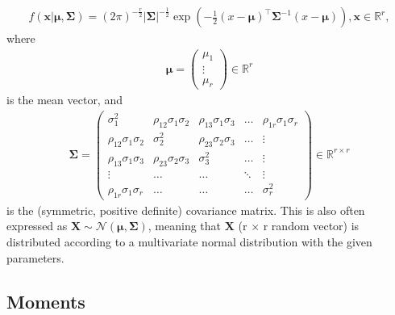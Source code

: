 \begin{definition}
    \begin{align}
        f(\bm{x}| \bm{\mu}, \bm{\Sigma})
        = (2\pi)^{-\frac{r}{2}}
        \left|\bm{\Sigma}\right|^{-\frac{1}{2}}
        \exp\left(-\frac{1}{2}(x-\bm{\mu})^\top \bm{\Sigma}^{-1} (x-\bm{\mu})\right),
        \bm{x} \in \mathbb{R}^r,
    \end{align}
    where
    \begin{align}
        \bm{\mu} =
        \begin{pmatrix}
            \mu_1  \\
            \vdots \\
            \mu_r
        \end{pmatrix}
        \in \mathbb{R}^r
    \end{align}
    is the mean vector, and
    \begin{align}
        \bm{\Sigma} =
        \begin{pmatrix}
            \sigma_1^2                & \rho_{12}\sigma_1\sigma_2 & \rho_{13}\sigma_1\sigma_3 & \ldots & \rho_{1r}\sigma_1\sigma_r \\
            \rho_{12}\sigma_1\sigma_2 & \sigma_2^2                & \rho_{23}\sigma_2\sigma_3 & \ldots & \vdots                    \\
            \rho_{13}\sigma_1\sigma_3 & \rho_{23}\sigma_2\sigma_3 & \sigma_3^2                & \ldots & \vdots                    \\
            \vdots                    & \ldots                    & \ldots                    & \ddots & \vdots                    \\
            \rho_{1r}\sigma_1\sigma_r & \ldots                    & \ldots                    & \ldots & \sigma_r^2
        \end{pmatrix}
        \in \mathbb{R}^{r\times r}
    \end{align}
    is the (symmetric, positive definite) covariance matrix.
    This is also often expressed as $\bm{X} \sim \mathcal{N}(\bm{\mu}, \bm{\Sigma})$,
    meaning that $\bm{X}$ (r $\times$ r random vector) is distributed
    according to a multivariate normal distribution with the given parameters.
\end{definition}

\subsection{Moments}\label{subsec:moments}

